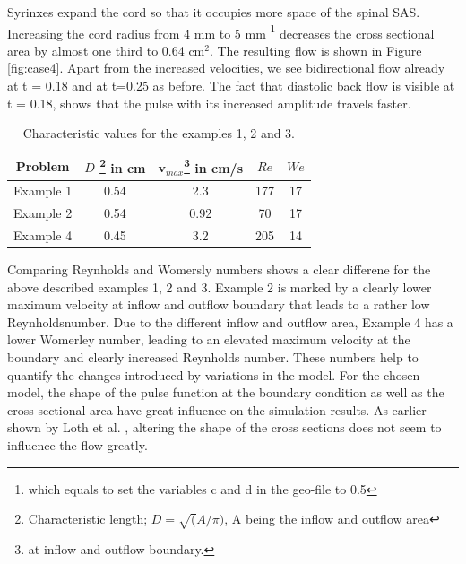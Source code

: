 Syrinxes expand the cord so that it occupies more space of the spinal SAS. Increasing the cord radius from 4 mm to 5 mm \footnote{which equals to set the variables c and d in the geo-file to 0.5} decreases the cross sectional area by almost one third to 0.64 $\mathrm{cm^2}$. The resulting flow is shown in Figure \ref{fig:case4}. Apart from the increased velocities, we see bidirectional flow already at t = 0.18 and at t=0.25 as before. The fact that diastolic back flow is visible at t = 0.18, shows that the pulse with its increased amplitude travels faster. 

\begin{table}\begin{center}
    \begin{tabular}{ | c | c | c | c | c |}
    \hline
    Problem & $D$ \footnote{Characteristic length; $D=\sqrt(A/\pi)$, A being the inflow and outflow area} in cm & $\mathbf{v}_{max}$\footnote{at inflow and outflow boundary.} in cm/s  & $Re$ & $We$ \\ \hline\hline
	Example 1 	&	0.54 & 2.3 & 177 & 17	\\ \hline
	Example 2	&	0.54 & 0.92 & 70 & 17	\\ \hline
	Example 4	&	0.45 & 3.2 	& 205 & 14	\\ \hline
    \end{tabular}
	\label{tab:Re_We}
	\caption{Characteristic values for the examples 1, 2 and 3.}
\end{center}\end{table}

Comparing Reynholds and Womersly numbers shows a clear differene for the above described examples 1, 2 and 3. Example 2 is marked by a clearly lower maximum velocity at inflow and outflow boundary that leads to a rather low Reynholdsnumber. Due to the different inflow and outflow area, Example 4 has a lower Womerley number, leading to an elevated maximum velocity at the boundary and clearly increased Reynholds number. These numbers help to quantify the changes introduced by variations in the model. For the chosen model, the shape of the pulse function at the boundary condition as well as the cross sectional area have great influence on the simulation results. As earlier shown by Loth et al. \cite{Loth2001}, altering the shape of the cross sections does not seem to influence the flow greatly.



